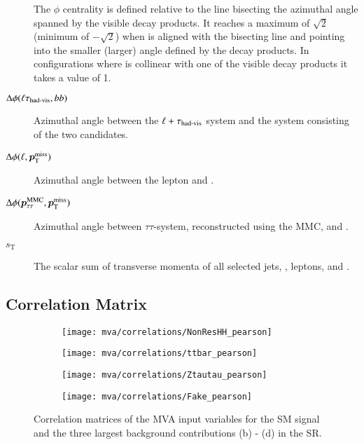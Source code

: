 \begin{description}
  The \pTmiss $\phi$ centrality is defined relative to the line bisecting the
  azimuthal angle spanned by the visible \taulepton decay products. It reaches a
  maximum of $\sqrt{2}$ (minimum of $-\sqrt{2}$) when \pTmiss is aligned with
  the bisecting line and pointing into the smaller (larger) angle defined by the
  decay products. In configurations where \pTmiss is collinear with one of the
  visible \taulepton decay products it takes a value of 1.

\item[$\Delta\phi(\ell\tau_{\text{had-vis}}, bb)$] Azimuthal angle between the
  $\ell + \tau_{\text{had-vis}}$ system and the system consisting of the two \bjet
  candidates.

\item[$\Delta\phi(\ell, \bm{p}_{\text{T}}^{\text{miss}})$] Azimuthal angle between the lepton and
  \pTmiss.

\item[$\Delta\phi(\bm{p}_{\tau\tau}^\text{MMC}, \bm{p}_{\text{T}}^{\text{miss}})$] Azimuthal angle between
  $\tau\tau$-system, reconstructed using the MMC, and \pTmiss.

\item[$s_{\text{T}}$] The scalar sum of transverse momenta of all selected jets,
  \tauhadvis, leptons, and \pTmissAbs.

\end{description}


\clearpage
\subsection{Correlation Matrix}

\begin{figure}[htbp]
  \centering

  \begin{subfigure}[t]{.49\textwidth}
    \texttt{[image: mva/correlations/NonResHH\_pearson]}
  \end{subfigure}\hfill %
  \begin{subfigure}[t]{.49\textwidth}
    \texttt{[image: mva/correlations/ttbar\_pearson]}
  \end{subfigure}

  \begin{subfigure}[t]{.49\textwidth}
    \texttt{[image: mva/correlations/Ztautau\_pearson]}
  \end{subfigure}\hfill %
  \begin{subfigure}[t]{.49\textwidth}
    \texttt{[image: mva/correlations/Fake\_pearson]}
  \end{subfigure}

  \caption{Correlation matrices of the MVA input variables for the SM \HH signal
    and the three largest background contributions (b) - (d) in the \hadhad
    SR.}%
  \label{fig:mva_input_correlations}
\end{figure}



